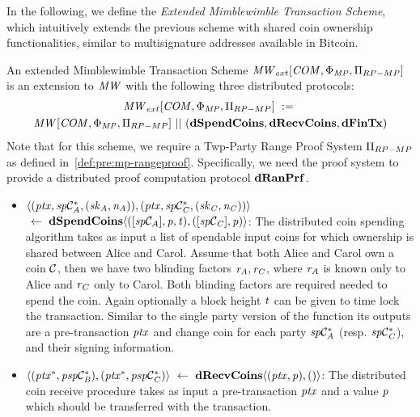 In the following, we define the \emph{Extended Mimblewimble Transaction Scheme}, which intuitively extends the previous scheme with shared coin ownership functionalities, similar to multisignature addresses available in Bitcoin.

\begin{definition}
    \label{def:atom:ext-mw-tx-scheme}
    An extended Mimblewimble Transaction Scheme $\mathit{MW}_{ext}[\mathit{COM},\Phi_{\mathit{MP}},\Pi_{RP-MP}]$ is an extension to $\mathit{MW}$ with the following three distributed protocols:
    \begin{gather*}
        \mathit{MW}_{ext}[\mathit{COM},\Phi_{\mathit{MP}},\Pi_{RP-MP}] ~:=~ \\ \mathit{MW}[\mathit{COM},\Phi_{\mathit{MP}},\Pi_{RP-MP}] ~||~ (\mathbf{dSpendCoins},\mathbf{dRecvCoins}, \mathbf{dFinTx})
    \end{gather*}
    Note that for this scheme, we require a Twp-Party Range Proof System $\Pi_{RP-MP}$ as defined in~\cref{def:pre:mp-rangeproof}.
    Specifically, we need the proof system to provide a distributed proof computation protocol $\mathbf{dRanPrf}$.
    \begin{itemize}
        \item $\langle (\mathit{ptx}, \mathit{sp}\mathcal{C}_{\mathit{A}}^*, (\mathit{sk}_{\mathit{A}},\mathit{\mathit{n}_{\mathit{A}}})), (\mathit{ptx}, \mathit{sp}\mathcal{C}_{\mathit{C}}^*, (\mathit{sk}_{\mathit{C}},\mathit{\mathit{n}_{\mathit{C}}})) \rangle$ \\
        $~\leftarrow~ \mathbf{dSpendCoins} \langle ([\mathit{sp}\mathcal{C}_{\mathit{A}}],\mathit{p},\mathit{t}), ([\mathit{sp}\mathcal{C}_{\mathit{C}}],\mathit{p}) \rangle$:
        The distributed coin spending algorithm takes as input a list of spendable input coins for which ownership is shared between Alice and Carol.
        Assume that both Alice and Carol own a coin $\mathcal{C}$, then we have two blinding factors $\mathit{r}_{\mathit{A}}, \mathit{r}_{\mathit{C}}$, where $\mathit{r}_{\mathit{A}}$ is known only to Alice and $\mathit{r}_{\mathit{C}}$ only to Carol.
        Both blinding factors are required needed to spend the coin.
        Again optionally a block height $\mathit{t}$ can be given to time lock the transaction.
        Similar to the single party version of the function its outputs are a pre-transaction $\mathit{ptx}$ and change coin for each party $\mathit{sp}\mathcal{C}_{\mathit{A}}^*$ (resp. $\mathit{sp}\mathcal{C}_{\mathit{C}}^*$), and their signing information.
        \item $\langle (\mathit{ptx}^*, \mathit{psp}\mathcal{C}_{\mathit{B}}^*), (\mathit{ptx}^*, \mathit{psp}\mathcal{C}_{\mathit{C}}^*) \rangle ~\leftarrow~ \mathbf{dRecvCoins} \langle(\mathit{ptx},\mathit{p}), () \rangle$: The distributed coin receive procedure takes as input a pre-transaction $\mathit{ptx}$ and a value $\mathit{p}$ which should be transferred with the transaction.

\end{itemize}
\end{definition}
